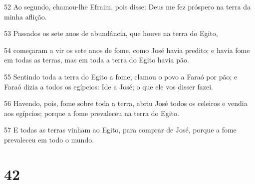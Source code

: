\par 52 Ao segundo, chamou-lhe Efraim, pois disse: Deus me fez próspero na terra da minha aflição.
\par 53 Passados os sete anos de abundância, que houve na terra do Egito,
\par 54 começaram a vir os sete anos de fome, como José havia predito; e havia fome em todas as terras, mas em toda a terra do Egito havia pão.
\par 55 Sentindo toda a terra do Egito a fome, clamou o povo a Faraó por pão; e Faraó dizia a todos os egípcios: Ide a José; o que ele vos disser fazei.
\par 56 Havendo, pois, fome sobre toda a terra, abriu José todos os celeiros e vendia aos egípcios; porque a fome prevaleceu na terra do Egito.
\par 57 E todas as terras vinham ao Egito, para comprar de José, porque a fome prevaleceu em todo o mundo.

\chapter{42}

